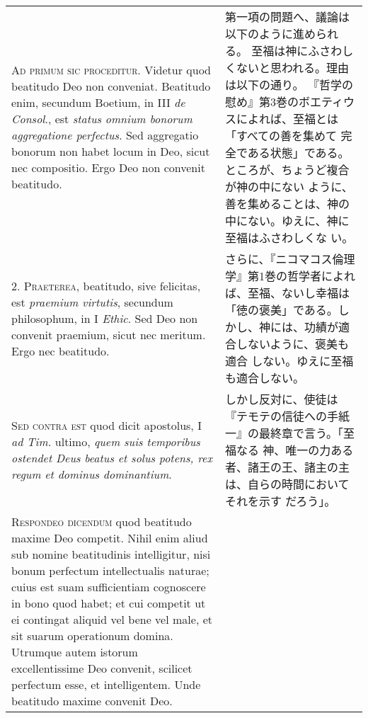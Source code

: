 \documentclass[10pt]{jsarticle} %
\begin{document}
\begin{longtable}{p{21em}p{21em}}


{\Huge A}{\scshape d primum sic proceditur}. Videtur quod beatitudo Deo non
conveniat. Beatitudo enim, secundum Boetium, in III {\itshape de Consol}., est
{\itshape status omnium bonorum aggregatione perfectus}. Sed aggregatio bonorum non
habet locum in Deo, sicut nec compositio. Ergo Deo non convenit
beatitudo.

&

第一項の問題へ、議論は以下のように進められる。
至福は神にふさわしくないと思われる。理由は以下の通り。
『哲学の慰め』第3巻のボエティウスによれば、至福とは「すべての善を集めて
 完全である状態」である。ところが、ちょうど複合が神の中にない
 ように、善を集めることは、神の中にない。ゆえに、神に至福はふさわしくな
 い。


\\



2. {\scshape Praeterea}, beatitudo, sive felicitas, est {\itshape praemium virtutis}, secundum
philosophum, in I {\itshape Ethic}. Sed Deo non convenit praemium, sicut nec
meritum. Ergo nec beatitudo.

&

さらに、『ニコマコス倫理学』第1巻の哲学者によれば、至福、ないし幸福は
「徳の褒美」である。しかし、神には、功績が適合しないように、褒美も適合
しない。ゆえに至福も適合しない。

\\



{\scshape Sed contra est} quod dicit apostolus, I {\itshape ad Tim.} ultimo, {\itshape quem suis
temporibus ostendet Deus beatus et solus potens, rex regum et dominus
dominantium}.

&

しかし反対に、使徒は『テモテの信徒への手紙一』の最終章で言う。「至福なる
 神、唯一の力ある者、諸王の王、諸主の主は、自らの時間においてそれを示す
 だろう」。

\\



{\scshape Respondeo dicendum} quod beatitudo maxime Deo competit. Nihil enim aliud
sub nomine beatitudinis intelligitur, nisi bonum perfectum
intellectualis naturae; cuius est suam sufficientiam cognoscere in bono
quod habet; et cui competit ut ei contingat aliquid vel bene vel male,
et sit suarum operationum domina. Utrumque autem istorum excellentissime
Deo convenit, scilicet perfectum esse, et intelligentem. Unde beatitudo
maxime convenit Deo.


\end{longtable}
\end{document}
